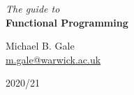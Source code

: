 
\begin{titlepage}
	\begin{center}
		
{\Huge \textit{The guide to}} \\[0.2cm]
{\Huge \textbf{Functional Programming}} \\[0.2cm]

\vfill

\scalebox{25.0}{$\lambda$}

\vfill 

{\LARGE Michael B. Gale} \\[0.1cm]
{\large \href{mailto:m.gale@warwick.ac.uk}{m.gale@warwick.ac.uk}}

\vspace{1cm}

{\Large 2020/21}
\end{center}
\end{titlepage}